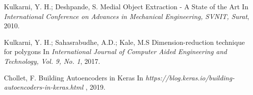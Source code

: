 \documentclass{article}
\begin{document}
\begin{thebibliography}{1}

Kulkarni, Y. H.; Deshpande, S.
\newblock Medial Object Extraction - A State of the Art
\newblock In {\em International Conference on Advances in Mechanical Engineering, SVNIT, Surat}, 2010.

Kulkarni, Y. H.; Sahasrabudhe, A.D.; Kale, M.S
\newblock Dimension-reduction technique for polygons
\newblock In {\em International Journal of Computer Aided Engineering and Technology, Vol. 9, No. 1}, 2017.

Chollet, F.
\newblock Building Autoencoders in Keras
\newblock In {\em https://blog.keras.io/building-autoencoders-in-keras.html }, 2019.

\end{thebibliography}
\end{document}
